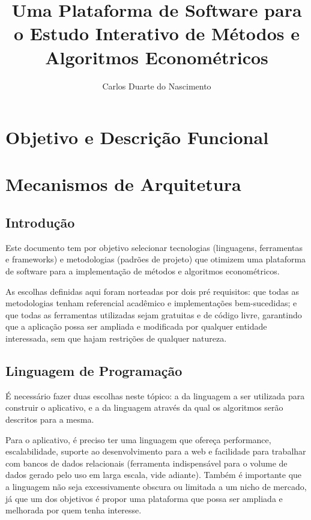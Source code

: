 \documentclass[11pt]{book}
\title{Uma Plataforma de Software para o Estudo Interativo de Métodos e Algoritmos Econométricos}
\author{Carlos Duarte do Nascimento}
\begin{document}
\maketitle
\tableofcontents

\chapter{Objetivo e Descrição Funcional}

\chapter{Mecanismos de Arquitetura}
\section{Introdução}
Este documento tem por objetivo selecionar tecnologias (linguagens, ferramentas e frameworks) e metodologias (padrões de projeto) que otimizem uma plataforma de software para a implementação de métodos e algoritmos econométricos.

As escolhas definidas aqui foram norteadas por dois pré requisitos: que todas as metodologias tenham referencial acadêmico e implementações bem-sucedidas; e que todas as ferramentas utilizadas sejam gratuitas e de código livre, garantindo que a aplicação  possa ser ampliada e modificada por qualquer entidade interessada, sem que hajam restrições de qualquer natureza.
\section{Linguagem de Programação}
É necessário fazer duas escolhas neste tópico: a da linguagem a ser utilizada para construir o aplicativo, e a da linguagem através da qual os algoritmos serão descritos para a mesma.

Para o aplicativo, é preciso ter uma linguagem que ofereça performance, escalabilidade, suporte ao desenvolvimento para a web e facilidade para trabalhar com bancos de dados relacionais (ferramenta indispensável para o volume de dados gerado pelo uso em larga escala, vide adiante). Também é importante que a linguagem não seja excessivamente obscura ou limitada a um nicho de mercado, já que um dos objetivos é propor uma plataforma que possa ser ampliada e melhorada por quem tenha interesse.
\end{document}
